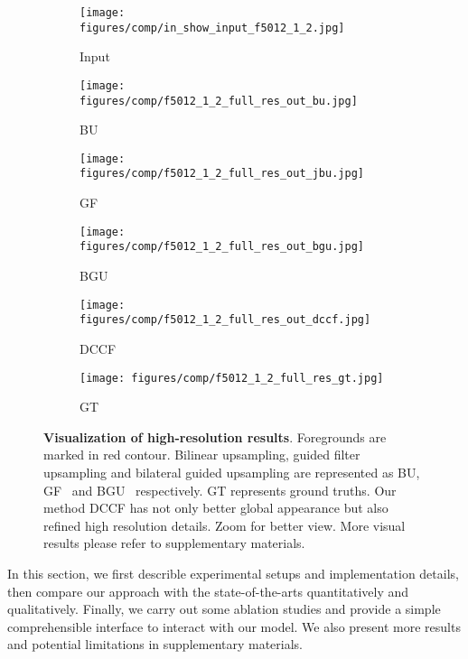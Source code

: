 \documentclass[runningheads]{llncs}
\begin{document}
\begin{figure*}[!thb]
        \begin{subfigure}[t]{0.15\linewidth}
            \centering
            \texttt{[image: figures/comp/in\_show\_input\_f5012\_1\_2.jpg]}
            \caption{Input}
        \end{subfigure}
        \begin{subfigure}[t]{0.15\linewidth}
            \centering
            \texttt{[image: figures/comp/f5012\_1\_2\_full\_res\_out\_bu.jpg]}
            \caption{BU}
        \end{subfigure}
        \begin{subfigure}[t]{0.15\linewidth}
            \centering
            \texttt{[image: figures/comp/f5012\_1\_2\_full\_res\_out\_jbu.jpg]}
            \caption{GF}
        \end{subfigure}
        \begin{subfigure}[t]{0.15\linewidth}
            \centering
            \texttt{[image: figures/comp/f5012\_1\_2\_full\_res\_out\_bgu.jpg]}
            \caption{BGU}
        \end{subfigure}
        \begin{subfigure}[t]{0.15\linewidth}
            \centering
            \texttt{[image: figures/comp/f5012\_1\_2\_full\_res\_out\_dccf.jpg]}
            \caption{DCCF}
        \end{subfigure}
        \begin{subfigure}[t]{0.15\linewidth}
            \centering
            \texttt{[image: figures/comp/f5012\_1\_2\_full\_res\_gt.jpg]}
            \caption{GT}
        \end{subfigure}
 
        \caption{\textbf{Visualization of high-resolution results}. Foregrounds are marked in red contour.
        Bilinear upsampling, guided filter upsampling and bilateral guided upsampling are represented as BU, GF~\cite{hekaiming2013GF} and BGU~\cite{chen2016bilateral} respectively. 
        GT represents ground truths. 
        Our method DCCF has not only better global appearance but also refined high resolution details.
        Zoom for better view.
        More visual results please refer to supplementary materials.}
        \vspace{-15pt}
        \label{fig:HR_vis}
        
    \end{figure*}
    



    In this section, we first describle experimental setups and implementation details, then compare our approach with the state-of-the-arts quantitatively and qualitatively. 
    Finally, we carry out some ablation studies and provide a simple comprehensible interface to interact with our model. 
    We also present more results and potential limitations in supplementary materials.
\end{document}
